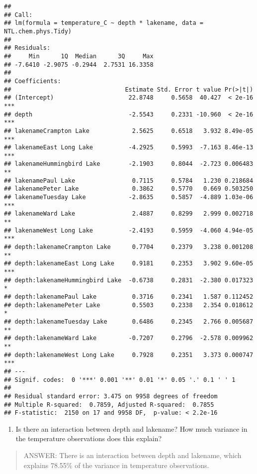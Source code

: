 \documentclass[]{article}
\providecommand{\tightlist}{%
  \setlength{\itemsep}{0pt}\setlength{\parskip}{0pt}}
\begin{document}
\begin{verbatim}
## 
## Call:
## lm(formula = temperature_C ~ depth * lakename, data = NTL.chem.phys.Tidy)
## 
## Residuals:
##     Min      1Q  Median      3Q     Max 
## -7.6410 -2.9075 -0.2944  2.7531 16.3358 
## 
## Coefficients:
##                                Estimate Std. Error t value Pr(>|t|)    
## (Intercept)                     22.8748     0.5658  40.427  < 2e-16 ***
## depth                           -2.5543     0.2331 -10.960  < 2e-16 ***
## lakenameCrampton Lake            2.5625     0.6518   3.932 8.49e-05 ***
## lakenameEast Long Lake          -4.2925     0.5993  -7.163 8.46e-13 ***
## lakenameHummingbird Lake        -2.1903     0.8044  -2.723 0.006483 ** 
## lakenamePaul Lake                0.7115     0.5784   1.230 0.218684    
## lakenamePeter Lake               0.3862     0.5770   0.669 0.503250    
## lakenameTuesday Lake            -2.8635     0.5857  -4.889 1.03e-06 ***
## lakenameWard Lake                2.4887     0.8299   2.999 0.002718 ** 
## lakenameWest Long Lake          -2.4193     0.5959  -4.060 4.94e-05 ***
## depth:lakenameCrampton Lake      0.7704     0.2379   3.238 0.001208 ** 
## depth:lakenameEast Long Lake     0.9181     0.2353   3.902 9.60e-05 ***
## depth:lakenameHummingbird Lake  -0.6738     0.2831  -2.380 0.017323 *  
## depth:lakenamePaul Lake          0.3716     0.2341   1.587 0.112452    
## depth:lakenamePeter Lake         0.5503     0.2338   2.354 0.018612 *  
## depth:lakenameTuesday Lake       0.6486     0.2345   2.766 0.005687 ** 
## depth:lakenameWard Lake         -0.7207     0.2796  -2.578 0.009962 ** 
## depth:lakenameWest Long Lake     0.7928     0.2351   3.373 0.000747 ***
## ---
## Signif. codes:  0 '***' 0.001 '**' 0.01 '*' 0.05 '.' 0.1 ' ' 1
## 
## Residual standard error: 3.475 on 9958 degrees of freedom
## Multiple R-squared:  0.7859, Adjusted R-squared:  0.7855 
## F-statistic:  2150 on 17 and 9958 DF,  p-value: < 2.2e-16
\end{verbatim}

\begin{enumerate}
\def\labelenumi{\arabic{enumi}.}
\setcounter{enumi}{14}
\tightlist
\item
  Is there an interaction between depth and lakename? How much variance
  in the temperature observations does this explain?
\end{enumerate}

\begin{quote}
ANSWER: There is an interaction between depth and lakename, which
explains 78.55\% of the variance in temperature observations.
\end{quote}
\end{document}
